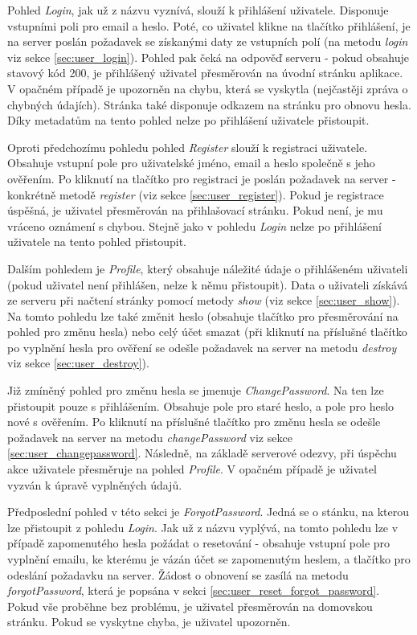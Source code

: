 		Pohled \textit{Login}, jak už z názvu vyznívá, slouží k přihlášení uživatele. Disponuje vstupními poli pro email a heslo. Poté, co uživatel klikne na tlačítko přihlášení, je na server poslán požadavek se získanými daty ze vstupních polí (na metodu \textit{login} viz sekce \ref{sec:user_login}). Pohled pak čeká na odpověď serveru - pokud obsahuje stavový kód 200, je přihlášený uživatel přesměrován na úvodní stránku aplikace. V opačném případě je upozorněn na chybu, která se vyskytla (nejčastěji zpráva o chybných údajích). Stránka také disponuje odkazem na stránku pro obnovu hesla. Díky metadatům na tento pohled nelze po přihlášení uživatele přistoupit.
		
		Oproti předchozímu pohledu pohled \textit{Register} slouží k registraci uživatele. Obsahuje vstupní pole pro uživatelské jméno, email a heslo společně s jeho ověřením. Po kliknutí na tlačítko pro registraci je poslán požadavek na server - konkrétně metodě \textit{register} (viz sekce \ref{sec:user_register}). Pokud je registrace úspěšná, je uživatel přesměrován na přihlašovací stránku. Pokud není, je mu vráceno oznámení s chybou. Stejně jako v pohledu \textit{Login} nelze po přihlášení uživatele na tento pohled přistoupit. 
		
		Dalším pohledem je \textit{Profile}, který obsahuje náležité údaje o přihlášeném uživateli (pokud uživatel není přihlášen, nelze k němu přistoupit). Data o uživateli získává ze serveru při načtení stránky pomocí metody \textit{show} (viz sekce \ref{sec:user_show}). Na tomto pohledu lze také změnit heslo (obsahuje tlačítko pro přesměrování na pohled pro změnu hesla) nebo celý účet smazat (při kliknutí na příslušné tlačítko po vyplnění hesla pro ověření se odešle požadavek na server na metodu \textit{destroy} viz sekce \ref{sec:user_destroy}).
		
		Již zmíněný pohled pro změnu hesla se jmenuje \textit{ChangePassword}. Na ten lze přistoupit pouze s přihlášením. Obsahuje pole pro staré heslo, a pole pro heslo nové s ověřením. Po kliknutí na příslušné tlačítko pro změnu hesla se odešle požadavek na server na metodu \textit{changePassword} viz sekce \ref{sec:user_changepassword}. Následně, na základě serverové odezvy, při úspěchu akce uživatele přesměruje na pohled \textit{Profile}. V opačném případě je uživatel vyzván k úpravě vyplněných údajů.
		
		Předposlední pohled v této sekci je \textit{ForgotPassword}. Jedná se o stánku, na kterou lze přistoupit z pohledu \textit{Login}. Jak už z názvu vyplývá, na tomto pohledu lze v případě zapomenutého hesla požádat o resetování - obsahuje vstupní pole pro vyplnění emailu, ke kterému je vázán účet se zapomenutým heslem, a tlačítko pro odeslání požadavku na server. Žádost o obnovení se zasílá na metodu \textit{forgotPassword}, která je popsána v sekci \ref{sec:user_reset_forgot_password}. Pokud vše proběhne bez problému, je uživatel přesměrován na domovskou stránku. Pokud se vyskytne chyba, je uživatel upozorněn.
		
